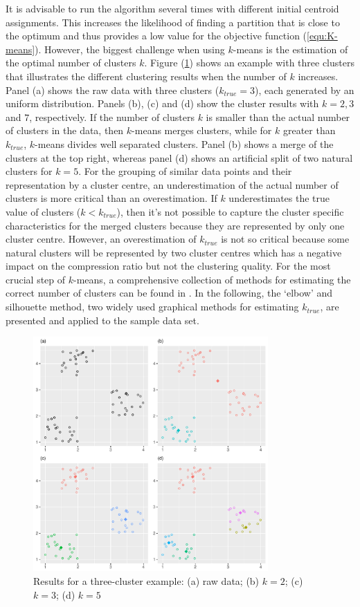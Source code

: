 It is advisable to run the algorithm several times with different initial centroid assignments. This increases the likelihood of finding a partition that is close to the optimum and thus provides a low value for the objective function (\ref{equ:K-means}). However, the biggest challenge when using $k$-means is the estimation of the optimal number of clusters $k$. Figure (\ref{fig:cluster_centers}) shows an example with three clusters that illustrates the different clustering results when the number of $k$  increases. Panel (a) shows the raw data with three clusters ($k_{true} = 3$), each generated by an uniform distribution. Panels (b), (c) and (d) show the cluster results with $k = 2, 3 $ and $7$, respectively. If the number of clusters $k$ is smaller than the actual number of clusters in the data, then $k$-means merges clusters, while for $k$ greater than $k_{true}$, $k$-means divides well separated clusters. Panel (b) shows a merge of the clusters at the top right, whereas panel (d) shows an artificial split of two natural clusters for $k=5$. For the grouping of similar data points and their representation by a cluster centre, an underestimation of the actual number of clusters is more critical than an overestimation. If $k$ underestimates the true value of clusters ($k < k_{true}$), then it's  not possible to capture the cluster specific characteristics for the merged clusters because they are represented by only one cluster centre. However, an overestimation of $k_{true}$ is not so critical because some natural clusters will be represented by two cluster centres which has a negative impact on the compression ratio but not the clustering quality. For the most crucial step of $k$-means, a comprehensive collection of methods for estimating the correct number of clusters can be found in \cite{milligan1985examination}. In the following, the `elbow' and silhouette method, two widely used graphical methods for estimating $k_{true}$, are presented and applied to the sample data set. 
\begin{figure}
	\centering
	\includegraphics[width=0.8\textwidth]{figures/chapter_k_means/cluster_centers}
	\caption{Results for a three-cluster example: (a) raw data; (b) $k=2$; (c) $k=3$; (d) $k=5$}
	\label{fig:cluster_centers}
\end{figure}


